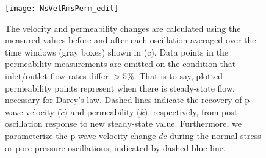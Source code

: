 
\newpage

\begin{figure}[ht]
	\centering
	\texttt{[image: NsVelRmsPerm\_edit]}
	\caption[]{The velocity and permeability changes are calculated using the measured values before and after each oscillation averaged over the time windows (gray boxes) shown in (c). Data points in the permeability measurements are omitted on the condition that inlet/outlet flow rates differ $ > 5 \% $. That is to say, plotted permeability points represent when there is steady-state flow, necessary for Darcy’s law. Dashed lines indicate the recovery of p-wave velocity ($ \dot c$) and permeability ($\dot k$), respectively, from post-oscillation response to new steady-state value. Furthermore, we parameterize the p-wave velocity change $ dc $ during the normal stress or pore pressure oscillations, indicated by dashed blue line.}
	\label{fig:delc_delk_calc}
\end{figure}

\newpage

